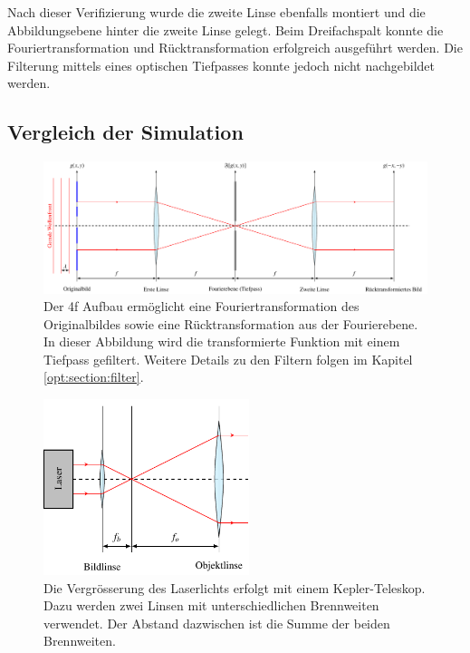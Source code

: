 Nach dieser Verifizierung wurde die zweite Linse ebenfalls montiert und die Abbildungsebene hinter die zweite Linse gelegt.
Beim Dreifachspalt konnte die Fouriertransformation und Rücktransformation erfolgreich ausgeführt werden.
Die Filterung mittels eines optischen Tiefpasses konnte jedoch nicht nachgebildet werden.

\subsection{Vergleich der Simulation}

\begin{figure}
    \centering
    \includegraphics[width=\textwidth]{papers/opt/images/4fAufbau.pdf}
    \caption{Der 4f Aufbau ermöglicht eine Fouriertransformation des Originalbildes sowie eine Rücktransformation aus der Fourierebene.
    In dieser Abbildung wird die transformierte Funktion mit einem Tiefpass gefiltert.
    Weitere Details zu den Filtern folgen im Kapitel \ref{opt:section:filter}.}
    \label{opt:fig:4fAufbau}
\end{figure}

\begin{figure}
    \centering
    \includegraphics[width=60mm]{papers/opt/images/laserAufweiten.pdf}
    \caption{Die Vergrösserung des Laserlichts erfolgt mit einem Kepler-Teleskop.
        Dazu werden zwei Linsen mit unterschiedlichen Brennweiten verwendet.
        Der Abstand dazwischen ist die Summe der beiden Brennweiten.}
    \label{opt:fig:laserAufweiten}
\end{figure}
